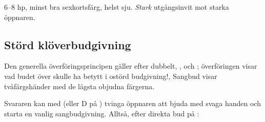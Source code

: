    \item[--\ho{3}] 6--8 hp, minst bra sexkortsf\"arg, helst sju. {\em Stark}
                    utg{\aa}ngsinvit mot starka \"oppnaren.


\ebe

\subsection{St{\"o}rd kl{\"o}verbudgivning}

Den generella överföringsprincipen gäller efter dubbelt, , och
; överföringen visar vad budet 
över skulle ha betytt i ostörd budgivning!, Sangbud visar tvåfärgshänder
med de lägsta objudna färgerna. 

Svararen kan med  (eller D på ) tvinga öppnaren att bjuda
 med svaga handen och starta en vanlig sangbudgivning.
Alltså,
efter direkta bud p{\aa} :

